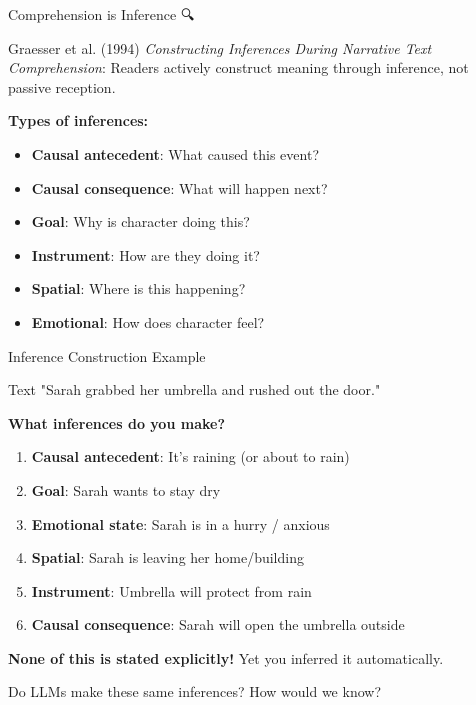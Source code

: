 \documentclass[aspectratio=169]{beamer}
\begin{document}
\begin{frame}[shrink=10]{Comprehension is Inference 🔍}
\small
    \begin{block}{Graesser et al. (1994)}
        \textit{Constructing Inferences During Narrative Text Comprehension}: Readers actively construct meaning through inference, not passive reception.
    \end{block}

    \vspace{0.3cm}

    \textbf{Types of inferences:}
    \begin{itemize}\setlength{\itemsep}{0pt}
        \item \textbf{Causal antecedent}: What caused this event?
        \item \textbf{Causal consequence}: What will happen next?
        \item \textbf{Goal}: Why is character doing this?
        \item \textbf{Instrument}: How are they doing it?
        \item \textbf{Spatial}: Where is this happening?
        \item \textbf{Emotional}: How does character feel?
    \end{itemize}
\end{frame}

\begin{frame}[shrink=10]{Inference Construction Example 📖}
\small
    \begin{block}{Text}
        "Sarah grabbed her umbrella and rushed out the door."
    \end{block}

    \vspace{0.3cm}

    \textbf{What inferences do you make?}

    \begin{enumerate}\setlength{\itemsep}{0pt}
        \item \textbf{Causal antecedent}: It's raining (or about to rain)
        \item \textbf{Goal}: Sarah wants to stay dry
        \item \textbf{Emotional state}: Sarah is in a hurry / anxious
        \item \textbf{Spatial}: Sarah is leaving her home/building
        \item \textbf{Instrument}: Umbrella will protect from rain
        \item \textbf{Causal consequence}: Sarah will open the umbrella outside
    \end{enumerate}

    \vspace{0.3cm}

    \textbf{None of this is stated explicitly!} Yet you inferred it automatically.

    \vspace{0.3cm}

    \begin{thinkaboutit}
        Do LLMs make these same inferences? How would we know?
    \end{thinkaboutit}
\end{frame}
\end{document}
